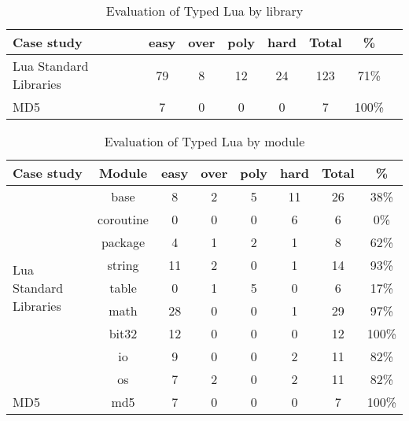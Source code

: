 \begin{table}[!ht]
\begin{center}
\begin{tabular}{|l|c|c|c|c|c|c|c|}
\hline
\textbf{Case study} & \textbf{easy} & \textbf{over} & \textbf{poly} & \textbf{hard} & \textbf{Total} & \textbf{\%} \\
\hline
Lua Standard Libraries & 79 & 8 & 12 & 24 & 123 & 71\% \\
\hline
MD5 & 7 & 0 & 0 & 0 & 7 & 100\% \\
\hline
\end{tabular}
\end{center}
\caption{Evaluation of Typed Lua by library}
\end{table}

\begin{table}[!ht]
\begin{center}
\begin{tabular}{|l|c|c|c|c|c|c|c|}
\hline
\textbf{Case study} & \textbf{Module} & \textbf{easy} & \textbf{over} & \textbf{poly} & \textbf{hard} & \textbf{Total} & \textbf{\%} \\
\hline
\multirow{9}{*}{Lua Standard Libraries}
& base & 8 & 2 & 5 & 11 & 26 & 38\% \\
\cline{2-8}
& coroutine & 0 & 0 & 0 & 6 & 6 & 0\% \\
\cline{2-8}
& package & 4 & 1 & 2 & 1 & 8 & 62\% \\
\cline{2-8}
& string & 11 & 2 & 0 & 1 & 14 & 93\% \\
\cline{2-8}
& table & 0 & 1 & 5 & 0 & 6 & 17\% \\
\cline{2-8}
& math & 28 & 0 & 0 & 1 & 29 & 97\% \\
\cline{2-8}
& bit32 & 12 & 0 & 0 & 0 & 12 & 100\% \\
\cline{2-8}
& io & 9 & 0 & 0 & 2 & 11 & 82\% \\
\cline{2-8}
& os & 7 & 2 & 0 & 2 & 11 & 82\% \\
\hline
\multirow{1}{*}{MD5}
& md5 & 7 & 0 & 0 & 0 & 7 & 100\% \\
\hline
\end{tabular}
\end{center}
\caption{Evaluation of Typed Lua by module}
\end{table}
